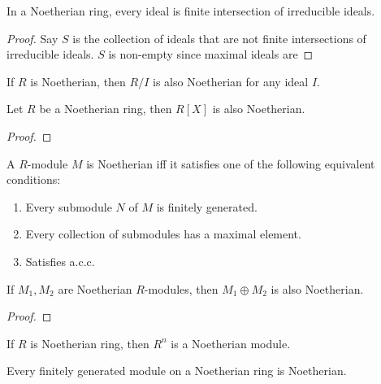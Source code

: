 \documentclass[oneside, 12pt]{scrbook}
\theoremstyle{theorem}
\begin{document}
\begin{theorem}
In a Noetherian ring, every ideal is finite intersection of irreducible ideals.
\end{theorem}

\begin{proof}
Say $S$ is the collection of ideals that are not finite intersections of irreducible ideals. $S$ is non-empty since maximal ideals are 
\end{proof}

\begin{proposition}
If $R$ is Noetherian, then $R/I$ is also Noetherian for any ideal $I$.
\end{proposition}


\begin{theorem}
Let $R$ be a Noetherian ring, then $R[X]$ is also Noetherian.
\end{theorem}

\begin{proof}

\end{proof}


\begin{definition}
A $R$-module $M$ is Noetherian iff it satisfies one of the following equivalent conditions: 
\begin{enumerate}
\item Every submodule $N$ of $M$ is finitely generated.
\item Every collection of submodules has a maximal element.
\item Satisfies a.c.c. 
\end{enumerate}
\end{definition}

\begin{proposition}
If $M_{1}, M_{2}$ are Noetherian $R$-modules, then $M_{1} \oplus M_{2}$ is also Noetherian. 
\end{proposition}

\begin{proof}

\end{proof}

\begin{corollary}
If $R$ is Noetherian ring, then $R^n$ is a Noetherian module.
\end{corollary}

\begin{proposition}
Every finitely generated module on a Noetherian ring is Noetherian.
\end{proposition}
\end{document}
